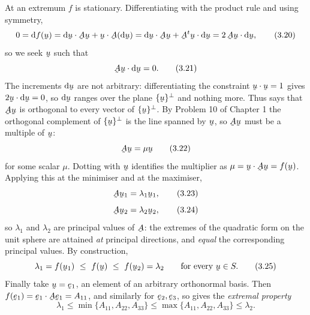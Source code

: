 At an extremum $f$ is stationary. Differentiating  with the product
rule and using symmetry,
\begin{equation}
   0=\dl f(\bu)=\ip{\dl\bu}{\bA\bu}+\ip{\bu}{\bA(\dl\bu)}
    =\ip{\dl\bu}{\bA\bu}+\ip{\bA^{t}\bu}{\dl\bu}
    =2\,\ip{\bA\bu}{\dl\bu},
   \tag{3.20}\label{eq:3.20}
\end{equation}
so we seek $\bu$ such that
\begin{equation}
   \ip{\bA\bu}{\dl\bu}=0 .
   \tag{3.21}\label{eq:3.21}
\end{equation}
The increments $\dl\bu$ are not arbitrary: differentiating the constraint
$\ip\bu\bu=1$ gives $2\ip{\bu}{\dl\bu}=0$, so $\dl\bu$ ranges over the
plane $\{\bu\}^{\perp}$ and nothing more. Thus  says that $\bA\bu$
is orthogonal to every vector of $\{\bu\}^{\perp}$. By Problem 10 of
Chapter 1 the orthogonal complement of $\{\bu\}^{\perp}$ is the line
spanned by $\bu$, so $\bA\bu$ must be a multiple of $\bu$:
\begin{equation}
   \bA\bu=\mu\bu
   \tag{3.22}\label{eq:3.22}
\end{equation}
for some scalar $\mu$. Dotting with $\bu$ identifies the multiplier as
$\mu=\ip{\bu}{\bA\bu}=f(\bu)$. Applying this at the minimiser and at the
maximiser,
\begin{equation}
   \bA\bu_{1}=\lambda_{1}\bu_{1},
   \tag{3.23}\label{eq:3.23}
\end{equation}
\begin{equation}
   \bA\bu_{2}=\lambda_{2}\bu_{2},
   \tag{3.24}\label{eq:3.24}
\end{equation}
so $\lambda_{1}$ and $\lambda_{2}$ are principal values of $\bA$: the
extremes of the quadratic form on the unit sphere are attained \emph{at}
principal directions, and \emph{equal} the corresponding principal values.
By construction,
\begin{equation}
   \lambda_{1}=f(\bu_{1})\ \le\ f(\bu)\ \le\ f(\bu_{2})=\lambda_{2}
   \qquad\text{for every }\bu\in S .
   \tag{3.25}\label{eq:3.25}
\end{equation}
Finally take $\bu=\be_{1}$, an element of an arbitrary orthonormal basis.
Then $f(\be_{1})=\ip{\be_{1}}{\bA\be_{1}}=A_{11}$, and similarly for
$\be_{2},\be_{3}$, so  gives the \emph{extremal property}
\begin{equation}
   \lambda_{1}\le\min\{A_{11},A_{22},A_{33}\}
   \le\max\{A_{11},A_{22},A_{33}\}\le\lambda_{2}.
   \tag{3.26}\label{eq:3.26}
\end{equation}

